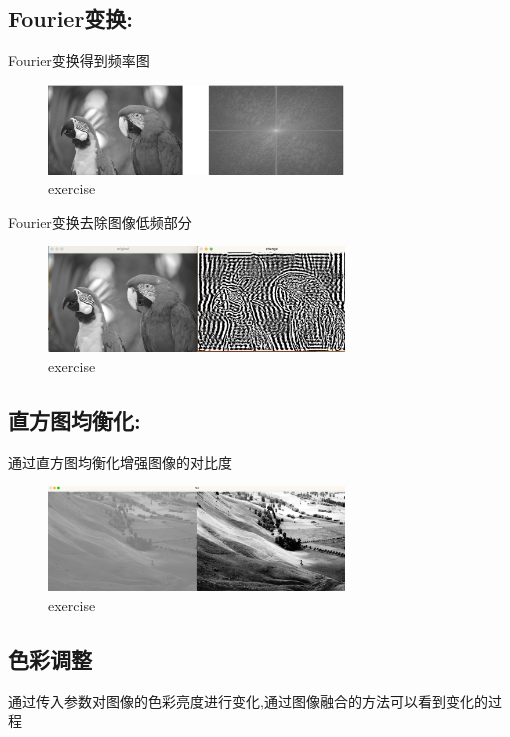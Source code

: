 \documentclass{article}
\begin{document}
\subsection*{Fourier变换:}
Fourier变换得到频率图
\begin{figure}[H]
	\centering
	\includegraphics[width=0.7\textwidth]{6.png}
	\caption{\label{pr1}exercise}
	\end{figure}

Fourier变换去除图像低频部分
\begin{figure}[H]
	\centering
	\includegraphics[width=0.7\textwidth]{7.png}
	\caption{\label{pr1}exercise}
	\end{figure}

\subsection*{直方图均衡化:}
通过直方图均衡化增强图像的对比度
\begin{figure}[H]
	\centering
	\includegraphics[width=0.7\textwidth]{8.png}
	\caption{\label{pr1}exercise}
	\end{figure}

\subsection*{色彩调整}

通过传入参数对图像的色彩亮度进行变化,通过图像融合的方法可以看到变化的过程
\end{document}
